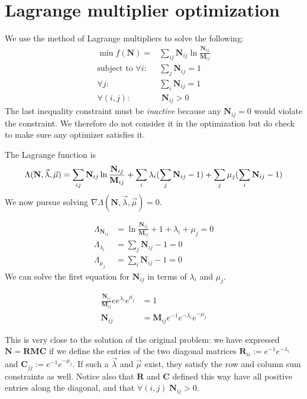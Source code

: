 \documentclass[10pt,a4paper]{article}
\newcommand{\matr}[1]{\mathbf{#1}} %
\DeclarePairedDelimiter{\paren}{(}{)}
\begin{document}
\section{Lagrange multiplier optimization}
We use the method of Lagrange multipliers to solve the following:
\begin{align*}
\min f(\matr{N}) = &\sum_{ij} \matr{N}_{ij} \ln \frac{\matr{N}_{ij}}{\matr{M}_{ij}} \\
\text{subject to } \forall i: &\sum_j \matr{N}_{ij} = 1 \\
\forall j: &\sum_i \matr{N}_{ij} = 1 \\
\forall (i,j): &\;\matr{N}_{ij} > 0
\end{align*}
The last inequality constraint must be \textit{inactive} because any $\matr{N}_{ij} = 0$
would violate the constraint. We therefore do not consider it in the optimization
but do check to make sure any optimizer satisfies it.

The Lagrange function is 
\[
\Lambda(\matr{N},\vec{\lambda}, \vec{\mu}) = 
\sum_{ij} \matr{N}_{ij} \ln \frac{\matr{N}_{ij}}{\matr{M}_{ij}} 
+ \sum_i \lambda_i \paren{\sum_j \matr{N}_{ij} - 1}
+ \sum_j \mu_j \paren{\sum_i \matr{N}_{ij} - 1}
\]
We now pursue solving $\nabla \Lambda(\matr{N},\vec{\lambda}, \vec{\mu}) = 0$.

\begin{align*}
\Lambda_{\matr{N}_{ij}} &= \ln{\frac{\matr{N}_{ij}}{\matr{M}_{ij}}} + 1 
+ \lambda_{i} + \mu_j = 0 \\
\Lambda_{\lambda_i} &= \sum_j \matr{N}_{ij} - 1 = 0 \\
\Lambda_{\mu_j} &= \sum_i \matr{N}_{ij} - 1 = 0
\end{align*}
We can solve the first equation for $\matr{N}_{ij}$ in terms of $\lambda_i$ and $\mu_j$.

\begin{align*}
\frac{\matr{N}_{ij}}{\matr{M}_{ij}} ee^{\lambda_i}e^{\mu_j} &= 1 \\
\matr{N}_{ij} &= \matr{M}_{ij} e^{-1}e^{-\lambda_i}e^{-\mu_j}
\end{align*}

This is very close to the solution 
of the original problem: we have expressed 
$\matr{N} = \matr{R}\matr{M}\matr{C}$
if we define the entries of the two diagonal matrices 
$\matr{R}_{ii} := e^{-1}e^{-\lambda_i}$
and $\matr{C}_{jj} := e^{-1}e^{-\mu_j}$.
If such a $\vec{\lambda}$ and $\vec{\mu}$ exist,
they satisfy the row and column sum constraints as well.
Notice also that $\matr{R}$ and $\matr{C}$ defined this way have all positive entries along the diagonal,
and that $\forall (i,j) \; \matr{N}_{ij} > 0$.
\end{document}
